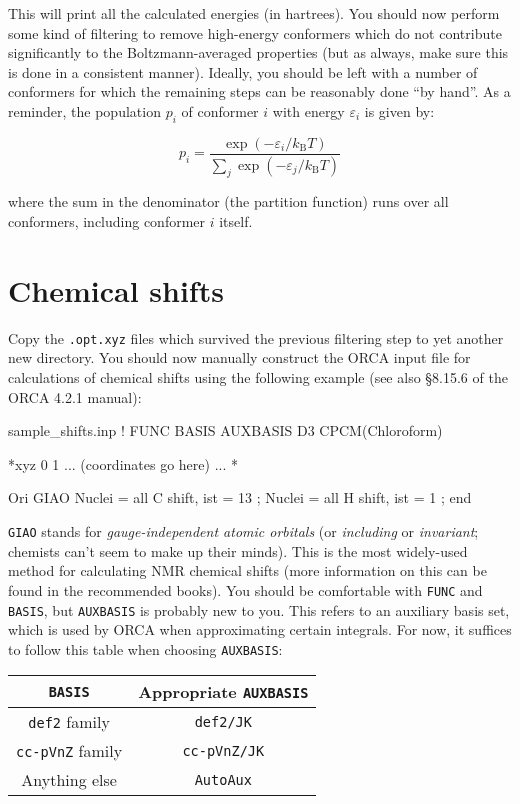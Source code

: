 \documentclass[10pt]{article}
\begin{document}
This will print all the calculated energies (in hartrees). You should now perform some kind of filtering to remove high-energy conformers which do not contribute significantly to the Boltzmann-averaged properties (but as always, make sure this is done in a consistent manner). Ideally, you should be left with a number of conformers for which the remaining steps can be reasonably done ``by hand''. As a reminder, the population \(p_i\) of conformer \(i\) with energy \(\varepsilon_i\) is given by:

\[ p_i = \frac{\exp(-\varepsilon_i/k_\mathrm{B}T)}{\sum_j \exp(-\varepsilon_j/k_\mathrm{B}T)} \]

where the sum in the denominator (the partition function) runs over all conformers, including conformer \(i\) itself.

\newpage

\section{Chemical shifts}

Copy the \texttt{.opt.xyz} files which survived the previous filtering step to yet another new directory. You should now manually construct the ORCA input file for calculations of chemical shifts using the following example (see also \S8.15.6 of the ORCA 4.2.1 manual):

\begin{script}{sample\_shifts.inp}
! FUNC BASIS AUXBASIS D3 CPCM(Chloroform)


*xyz 0 1
... (coordinates go here) ...
*

  Ori GIAO
  Nuclei = all C { shift, ist = 13 };
  Nuclei = all H { shift, ist = 1 };
end
\end{script}

\texttt{GIAO} stands for \textit{gauge-independent atomic orbitals} (or \textit{including} or \textit{invariant}; chemists can't seem to make up their minds). This is the most widely-used method for calculating NMR chemical shifts (more information on this can be found in the recommended books). You should be comfortable with \texttt{FUNC} and \texttt{BASIS}, but \texttt{AUXBASIS} is probably new to you. This refers to an auxiliary basis set, which is used by ORCA when approximating certain integrals. For now, it suffices to follow this table when choosing \texttt{AUXBASIS}:

\begin{center}
    \begin{tabular}{cc}
        \toprule
        \texttt{BASIS} & Appropriate \texttt{AUXBASIS} \\ \midrule
        \texttt{def2} family & \texttt{def2/JK} \\
        \texttt{cc-pVnZ} family & \texttt{cc-pVnZ/JK} \\
        Anything else & \texttt{AutoAux} \\
        \bottomrule
    \end{tabular}
\end{center}
\end{document}
